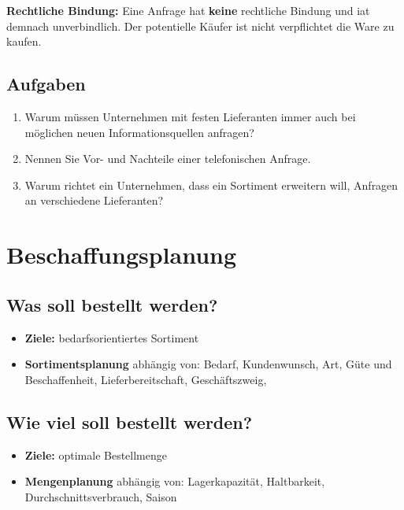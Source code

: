 \documentclass[a4paper,11pt]{scrartcl}	%
\begin{document}
	\textbf{Rechtliche Bindung:} Eine Anfrage hat \textbf{keine} rechtliche Bindung und iat demnach unverbindlich. Der potentielle Käufer ist nicht verpflichtet die Ware zu kaufen.\\[0.5cm]
	
	\subsection{Aufgaben}
	
		\begin{enumerate}
			\item Warum müssen Unternehmen mit festen Lieferanten immer auch bei möglichen neuen Informationsquellen anfragen? \par
			
			\item Nennen Sie Vor- und Nachteile einer telefonischen Anfrage. \par
			
			\item Warum richtet ein Unternehmen, dass ein Sortiment erweitern will, Anfragen an verschiedene Lieferanten? \par
			
		\end{enumerate}
\section{Beschaffungsplanung}
 	
 	\subsection{Was soll bestellt werden?}
 		
 		\begin{itemize}
 			\item \textbf{Ziele:} bedarfsorientiertes Sortiment
 			\item \textbf{Sortimentsplanung} abhängig von: Bedarf, Kundenwunsch, Art, Güte und Beschaffenheit, Lieferbereitschaft, Geschäftszweig, 
 		\end{itemize}
 		
 	\subsection{Wie viel soll bestellt werden?}
 	
 		\begin{itemize}
 			\item \textbf{Ziele:} optimale Bestellmenge
 			\item \textbf{Mengenplanung} abhängig von: Lagerkapazität, Haltbarkeit, Durchschnittsverbrauch, Saison
 		\end{itemize}
 		
\end{document}
